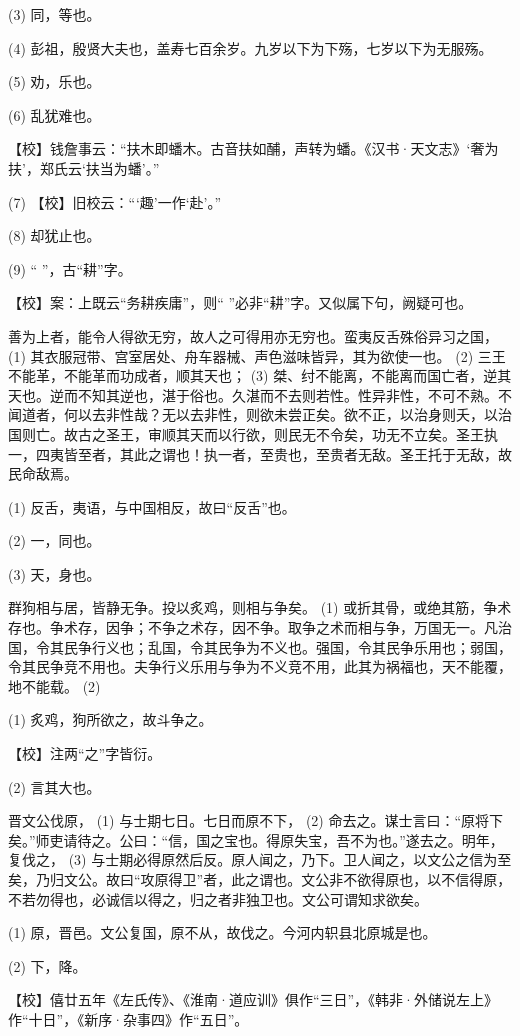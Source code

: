 \documentclass[12pt,UTF8]{ctexbook}
\begin{document}
(3) 同，等也。

(4) 彭祖，殷贤大夫也，盖寿七百余岁。九岁以下为下殇，七岁以下为无服殇。

(5) 劝，乐也。

(6) 乱犹难也。

【校】钱詹事云：“扶木即蟠木。古音扶如酺，声转为蟠。《汉书·天文志》‘奢为扶’，郑氏云‘扶当为蟠’。”

(7) 【校】旧校云：“‘趣’一作‘赴’。”

(8) 却犹止也。

(9) “ ”，古“耕”字。

【校】案：上既云“务耕疾庸”，则“ ”必非“耕”字。又似属下句，阙疑可也。

善为上者，能令人得欲无穷，故人之可得用亦无穷也。蛮夷反舌殊俗异习之国， (1) 其衣服冠带、宫室居处、舟车器械、声色滋味皆异，其为欲使一也。 (2) 三王不能革，不能革而功成者，顺其天也； (3) 桀、纣不能离，不能离而国亡者，逆其天也。逆而不知其逆也，湛于俗也。久湛而不去则若性。性异非性，不可不熟。不闻道者，何以去非性哉？无以去非性，则欲未尝正矣。欲不正，以治身则夭，以治国则亡。故古之圣王，审顺其天而以行欲，则民无不令矣，功无不立矣。圣王执一，四夷皆至者，其此之谓也！执一者，至贵也，至贵者无敌。圣王托于无敌，故民命敌焉。

(1) 反舌，夷语，与中国相反，故曰“反舌”也。

(2) 一，同也。

(3) 天，身也。

群狗相与居，皆静无争。投以炙鸡，则相与争矣。 (1) 或折其骨，或绝其筋，争术存也。争术存，因争；不争之术存，因不争。取争之术而相与争，万国无一。凡治国，令其民争行义也；乱国，令其民争为不义也。强国，令其民争乐用也；弱国，令其民争竞不用也。夫争行义乐用与争为不义竞不用，此其为祸福也，天不能覆，地不能载。 (2)

(1) 炙鸡，狗所欲之，故斗争之。

【校】注两“之”字皆衍。

(2) 言其大也。

晋文公伐原， (1) 与士期七日。七日而原不下， (2) 命去之。谋士言曰：“原将下矣。”师吏请待之。公曰：“信，国之宝也。得原失宝，吾不为也。”遂去之。明年，复伐之， (3) 与士期必得原然后反。原人闻之，乃下。卫人闻之，以文公之信为至矣，乃归文公。故曰“攻原得卫”者，此之谓也。文公非不欲得原也，以不信得原，不若勿得也，必诚信以得之，归之者非独卫也。文公可谓知求欲矣。

(1) 原，晋邑。文公复国，原不从，故伐之。今河内轵县北原城是也。

(2) 下，降。

【校】僖廿五年《左氏传》、《淮南·道应训》俱作“三日”，《韩非·外储说左上》作“十日”，《新序·杂事四》作“五日”。
\end{document}
